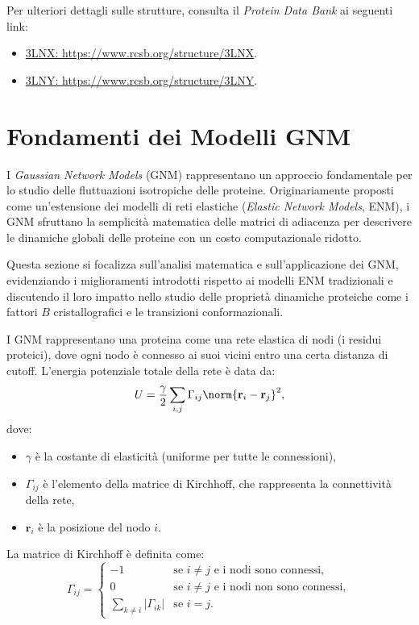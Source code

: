 \documentclass[Lau,binding=0.6cm,oneside,noexaminfo]{sapthesis}
\begin{document}
Per ulteriori dettagli sulle strutture, consulta il \textit{Protein Data Bank} ai seguenti link:
\begin{itemize}
    \item \href{https://www.rcsb.org/structure/3LNX}{3LNX: https://www.rcsb.org/structure/3LNX}.
    \item \href{https://www.rcsb.org/structure/3LNY}{3LNY: https://www.rcsb.org/structure/3LNY}.
\end{itemize}


\section{Fondamenti dei Modelli GNM}

I \emph{Gaussian Network Models} (GNM) rappresentano un approccio fondamentale per lo studio delle fluttuazioni isotropiche delle proteine. Originariamente proposti come un'estensione dei modelli di reti elastiche (\emph{Elastic Network Models}, ENM), i GNM sfruttano la semplicità matematica delle matrici di adiacenza per descrivere le dinamiche globali delle proteine con un costo computazionale ridotto.

Questa sezione si focalizza sull'analisi matematica e sull'applicazione dei GNM, evidenziando i miglioramenti introdotti rispetto ai modelli ENM tradizionali e discutendo il loro impatto nello studio delle proprietà dinamiche proteiche come i fattori \(B\) cristallografici e le transizioni conformazionali.

I GNM rappresentano una proteina come una rete elastica di nodi (i residui proteici), dove ogni nodo è connesso ai suoi vicini entro una certa distanza di cutoff. L'energia potenziale totale della rete è data da:
\begin{equation}
    U = \frac{\gamma}{2} \sum_{i,j} \Gamma_{ij} \norm{\mathbf{r}_i - \mathbf{r}_j}^2,
\end{equation}
dove:
\begin{itemize}
    \item \(\gamma\) è la costante di elasticità (uniforme per tutte le connessioni),
    \item \(\Gamma_{ij}\) è l'elemento della matrice di Kirchhoff, che rappresenta la connettività della rete,
    \item \(\mathbf{r}_i\) è la posizione del nodo \(i\).
\end{itemize}

La matrice di Kirchhoff è definita come:
\begin{equation}
    \Gamma_{ij} = 
    \begin{cases} 
      -1 & \text{se } i \neq j \text{ e i nodi sono connessi}, \\
      0 & \text{se } i \neq j \text{ e i nodi non sono connessi}, \\
      \sum_{k \neq i} |\Gamma_{ik}| & \text{se } i = j.
    \end{cases}
\end{equation}
\end{document}
